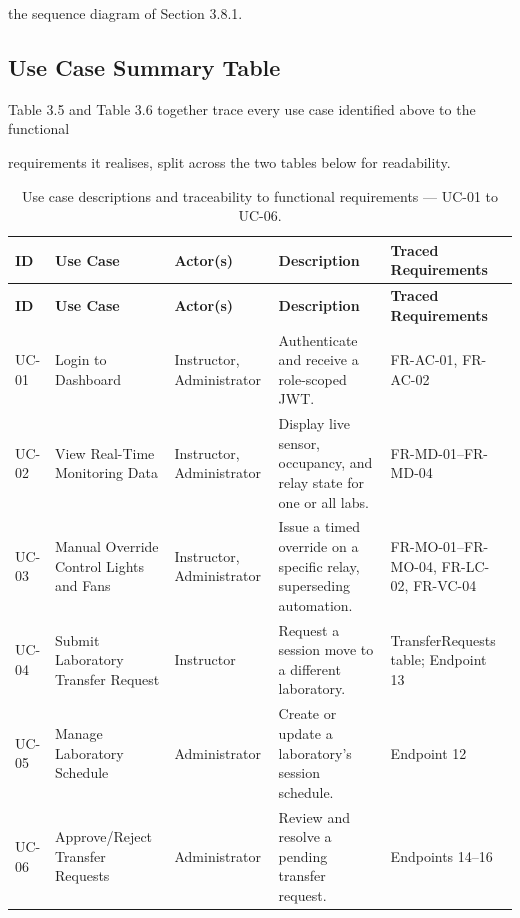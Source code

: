 the sequence diagram of Section 3.8.1.


\subsection{Use Case Summary Table}
Table 3.5 and Table 3.6 together trace every use case identified above to the functional

requirements it realises, split across the two tables below for readability.

\begin{longtable}{|L{1.5cm}|L{3.2cm}|L{2.8cm}|L{4.5cm}|L{2.5cm}|}
	\caption{Use case descriptions and traceability to functional requirements --- UC-01 to UC-06.} \label{tab:3-5}                                                                                   \\
	\hline
	\textbf{ID} & \textbf{Use Case}                       & \textbf{Actor(s)}         & \textbf{Description}                                                 & \textbf{Traced Requirements}           \\
	\hline
	\endfirsthead
	\hline
	\textbf{ID} & \textbf{Use Case}                       & \textbf{Actor(s)}         & \textbf{Description}                                                 & \textbf{Traced Requirements}           \\
	\hline
	\endhead
	\hline
	\endfoot
	\hline
	\endlastfoot
	UC-01       & Login to Dashboard                      & Instructor, Administrator & Authenticate and receive a role-scoped JWT.                          & FR-AC-01, FR-AC-02                     \\
	\hline
	UC-02       & View Real-Time Monitoring Data          & Instructor, Administrator & Display live sensor, occupancy, and relay state for one or all labs. & FR-MD-01--FR-MD-04                     \\
	\hline
	UC-03       & Manual Override Control Lights and Fans & Instructor, Administrator & Issue a timed override on a specific relay, superseding automation.  & FR-MO-01--FR-MO-04, FR-LC-02, FR-VC-04 \\
	\hline
	UC-04       & Submit Laboratory Transfer Request      & Instructor                & Request a session move to a different laboratory.                    & TransferRequests table; Endpoint 13    \\
	\hline
	UC-05       & Manage Laboratory Schedule              & Administrator             & Create or update a laboratory's session schedule.                    & Endpoint 12                            \\
	\hline
	UC-06       & Approve/Reject Transfer Requests        & Administrator             & Review and resolve a pending transfer request.                       & Endpoints 14--16                       \\
	\hline
\end{longtable}

